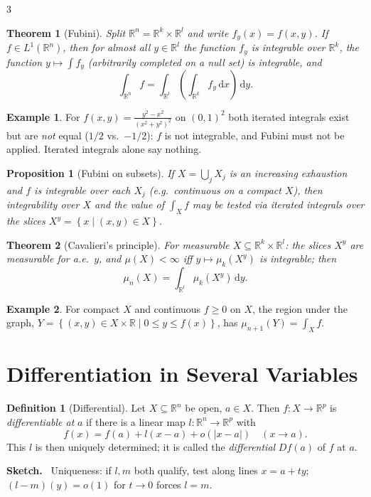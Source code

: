 \documentclass[10pt,a4paper,landscape]{article}
\theoremstyle{definition}
\newtheorem{defn}{Definition}[section]
\newtheorem{exm}{Example}[section]
\theoremstyle{plain}
\newtheorem{thm}{Theorem}[section]
\newtheorem{prop}{Proposition}[section]
\theoremstyle{remark}
\newcommand{\R}{\mathbb{R}}
\newcommand{\dd}{\,\mathrm{d}}
\newcommand{\abs}[1]{\lvert #1 \rvert}
\newcommand{\set}[1]{\left\{ #1 \right\}}
\newcommand{\oo}{\infty}
\newenvironment{proofsketch}{%
  \par\small\color{exgray}\textbf{Sketch.}\ }%
  {\par}
\begin{document}
\begin{multicols*}{3}
\begin{thm}[Fubini]
Split $\R^n = \R^k \times \R^l$ and write $f_y(x) = f(x,y)$. If $f \in L^1(\R^n)$, then for almost all $y \in \R^l$ the function $f_y$ is integrable over $\R^k$, the function $y \mapsto \int f_y$ (arbitrarily completed on a null set) is integrable, and
\[
\int_{\R^n} f = \int_{\R^l} \left( \int_{\R^k} f_y \dd x \right) \dd y .
\]
\end{thm}

\begin{exm}
For $f(x,y) = \frac{y^2 - x^2}{(x^2+y^2)^2}$ on $(0,1)^2$ both iterated integrals exist but are \emph{not} equal ($1/2$ vs.\ $-1/2$): $f$ is not integrable, and Fubini must not be applied. Iterated integrals alone say nothing.
\end{exm}

\begin{prop}[Fubini on subsets]
If $X = \bigcup_j X_j$ is an increasing exhaustion and $f$ is integrable over each $X_j$ (e.g.\ continuous on a compact $X$), then integrability over $X$ and the value of $\int_X f$ may be tested via iterated integrals over the slices $X^y = \set{x \mid (x,y) \in X}$.
\end{prop}

\begin{thm}[Cavalieri's principle]
For measurable $X \subseteq \R^k \times \R^l$: the slices $X^y$ are measurable for a.e.\ $y$, and $\mu(X) < \oo$ iff $y \mapsto \mu_k(X^y)$ is integrable; then
\[
\mu_n(X) = \int_{\R^l} \mu_k(X^y) \dd y .
\]
\end{thm}

\begin{exm}
For compact $X$ and continuous $f \ge 0$ on $X$, the region under the graph, $Y = \set{(x,y) \in X \times \R \mid 0 \le y \le f(x)}$, has $\mu_{n+1}(Y) = \int_X f$.
\end{exm}

\section{Differentiation in Several Variables}

\begin{defn}[Differential]
Let $X \subseteq \R^n$ be open, $a \in X$. Then $f: X \to \R^p$ is \emph{differentiable at} $a$ if there is a linear map $l: \R^n \to \R^p$ with
\[
f(x) = f(a) + l(x - a) + o(\abs{x-a}) \quad (x \to a).
\]
This $l$ is then uniquely determined; it is called the \emph{differential} $Df(a)$ of $f$ at $a$.
\begin{proofsketch}
Uniqueness: if $l, m$ both qualify, test along lines $x = a + ty$; $(l - m)(y) = o(1)$ for $t \to 0$ forces $l = m$.
\end{proofsketch}
\end{defn}


\end{multicols*}
\end{document}

